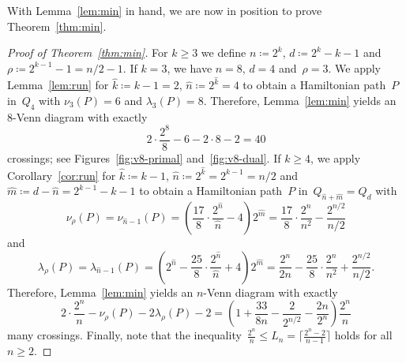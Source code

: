 \documentclass[11pt]{article}
\newcommand{\ass}{\coloneqq}
\newcommand{\wh}{\widehat}
\begin{document}
%
With Lemma~\ref{lem:min} in hand, we are now in position to prove Theorem~\ref{thm:min}.
%
\begin{proof}[Proof of Theorem~\ref{thm:min}]
For $k\ge 3$ we define $n\ass 2^k$, $d\ass 2^k-k-1$ and $\rho\ass 2^{k-1}-1=n/2-1$.
%
If $k=3$, we have $n=8$, $d=4$ and~$\rho=3$.
We apply Lemma~\ref{lem:run} for $\wh{k}\ass k-1=2$, $\wh{n}\ass 2^{\wh{k}}=4$ to obtain a Hamiltonian path~$P$ in~$Q_4$ with $\nu_3(P)=6$ and $\lambda_3(P)=8$.
Therefore, Lemma~\ref{lem:min} yields an $8$-Venn diagram with exactly
\[ 2\cdot\frac{2^8}{8}-6-2\cdot 8-2=40 \]
crossings; see Figures~\ref{fig:v8-primal} and~\ref{fig:v8-dual}.
%
If $k\ge 4$, we apply Corollary~\ref{cor:run} for $\wh{k}\ass k-1$, $\wh{n}\ass 2^{\wh{k}}=2^{k-1}=n/2$ and $\wh{m}\ass d-\wh{n}=2^{k-1}-k-1$ to obtain a Hamiltonian path~$P$ in~$Q_{\wh{n}+\wh{m}}=Q_d$ with
\[ \nu_\rho(P)=\nu_{\wh{n}-1}(P)=\left(\frac{17}{8}\cdot\frac{2^{\wh{n}}}{\wh{n}}-4\right)2^{\wh{m}}=\frac{17}{8}\cdot\frac{2^n}{n^2}-\frac{2^{n/2}}{n/2} \]
and
\[ \lambda_\rho(P)=\lambda_{\wh{n}-1}(P)=\left(2^{\wh{n}}-\frac{25}{8}\cdot \frac{2^{\wh{n}}}{\wh{n}}+4\right)2^{\wh{m}}=\frac{2^n}{2n}-\frac{25}{8}\cdot\frac{2^n}{n^2}+\frac{2^{n/2}}{n/2}. \]
Therefore, Lemma~\ref{lem:min} yields an $n$-Venn diagram with exactly
\[ 2\cdot\frac{2^n}{n}-\nu_\rho(P)-2\lambda_\rho(P)-2=\left(1+\frac{33}{8n}-\frac{2}{2^{n/2}}-\frac{2n}{2^n}\right)\frac{2^n}{n} \]
many crossings.
%
Finally, note that the inequality~$\frac{2^n}{n}\le L_n=\lceil\frac{2^n-2}{n-1}\rceil$ holds for all~$n\ge 2$.
\end{proof}
%
%
\end{document}
